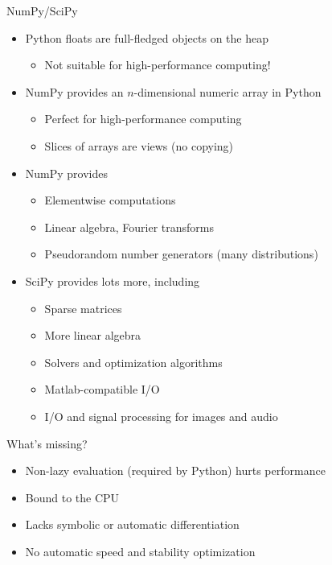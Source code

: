 \documentclass[utf8x,xcolor=pdftex,dvipsnames,table]{beamer}
\begin{document}
\begin{frame}{NumPy/SciPy}
  \begin{itemize}
  \item Python floats are full-fledged objects on the heap
      \begin{itemize}
      \item Not suitable for high-performance computing!
      \end{itemize}

  \item NumPy provides an $n$-dimensional numeric array in Python
      \begin{itemize}
      \item Perfect for high-performance computing
      \item Slices of arrays are views (no copying)
      \end{itemize}

  \item NumPy provides
      \begin{itemize}
      \item Elementwise computations
      \item Linear algebra, Fourier transforms
      \item Pseudorandom number generators (many distributions)
      \end{itemize}

  \item SciPy provides lots more, including
      \begin{itemize}
      \item Sparse matrices
      \item More linear algebra
      \item Solvers and optimization algorithms
      \item Matlab-compatible I/O
      \item I/O and signal processing for images and audio
      \end{itemize}
  \end{itemize}
\end{frame}

\begin{frame}{What's missing?}
  \begin{itemize}
    \item Non-lazy evaluation (required by Python) hurts performance
    \item Bound to the CPU
    \item Lacks symbolic or automatic differentiation
    \item No automatic speed and stability optimization
  \end{itemize}

\end{frame}
\end{document}
